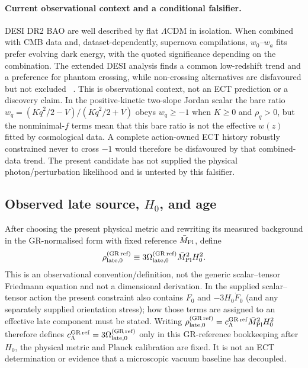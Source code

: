 \paragraph{Current observational context and a conditional falsifier.}
DESI DR2 BAO are well described by flat $\Lambda$CDM in isolation.  When
combined with CMB data and, dataset-dependently, supernova compilations,
$w_0$--$w_a$ fits prefer evolving dark energy, with the quoted significance
depending on the combination.  The extended DESI analysis finds a common
low-redshift trend and a preference for phantom crossing, while non-crossing
alternatives are disfavoured but not excluded
~\cite{DESIDR2_2025,Lodha2025}.  This is observational context, not an ECT
prediction or a discovery claim.  In the positive-kinetic two-slope Jordan
scalar the bare ratio
$w_q=(K\dot q^2/2-V)/(K\dot q^2/2+V)$ obeys $w_q\ge-1$ when $K\ge0$ and
$\rho_q>0$, but the nonminimal-$f$ terms mean that this bare ratio is not the
effective $w(z)$ fitted by cosmological data.  A complete action-owned ECT
history robustly constrained never to cross $-1$ would therefore be
disfavoured by that combined-data trend.  The present candidate has not
supplied the physical photon/perturbation likelihood and is untested by this
falsifier.

\subsection{Observed late source, $H_0$, and age}
\label{subsec:IR_estimate_cc}

After choosing the present physical metric and rewriting its measured
background in the GR-normalised form with fixed reference
$\bar M_{\rm Pl}$, define
\begin{equation}
 \rho_{\rm late,0}^{(\rm GR\,ref)}
 \equiv3\Omega_{\rm late,0}^{(\rm GR\,ref)}
 \bar M_{\rm Pl}^2H_0^2.
 \label{eq:IR_estimate_cc}
\end{equation}
This is an observational convention/definition, not the generic
scalar--tensor Friedmann equation and not a dimensional derivation.  In the
supplied scalar--tensor action the present constraint also contains $F_0$ and
$-3H_0\dot F_0$ (and any separately supplied orientation stress); how those
terms are assigned to an effective late component must be stated.  Writing
$\rho_{\rm late,0}^{(\rm GR\,ref)}=
c_\Lambda^{\rm GR\,ref}\bar M_{\rm Pl}^2H_0^2$ therefore defines
$c_\Lambda^{\rm GR\,ref}=3\Omega_{\rm late,0}^{(\rm GR\,ref)}$
only in this GR-reference bookkeeping
after $H_0$, the physical metric and Planck calibration are fixed.  It is not
an ECT determination or evidence that a microscopic vacuum baseline has
decoupled.

